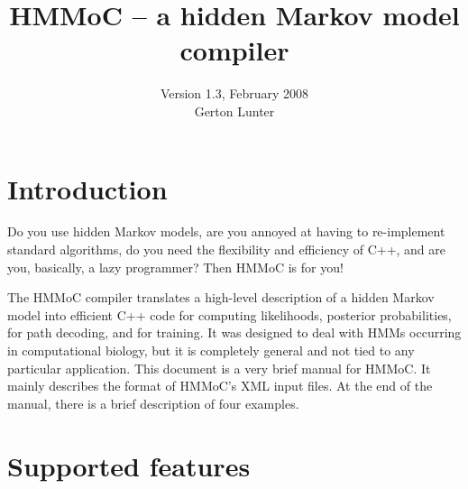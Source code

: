 \documentclass{article}
\title{HMMoC -- a hidden Markov model compiler}
\author{Version 1.3, February 2008 \\ Gerton Lunter}
\date{}
\begin{document}
\maketitle


\section{Introduction}

Do you use hidden Markov models, are you annoyed at having to re-implement 
standard algorithms, do you need the flexibility and efficiency of
C++, and are you, basically, a lazy programmer?  Then HMMoC is for you!

The HMMoC compiler translates a high-level description of a
hidden Markov model into efficient C++ code for computing likelihoods,
posterior probabilities, for path decoding, and for training.  It was 
designed to deal with HMMs occurring in computational biology, but it 
is completely general and not tied to any particular application.
This document is a very brief manual for HMMoC.  It mainly describes the 
format of HMMoC's XML input files.  At the end of the manual, there is a brief
description of four examples.


\section{Supported features}
\end{document}
